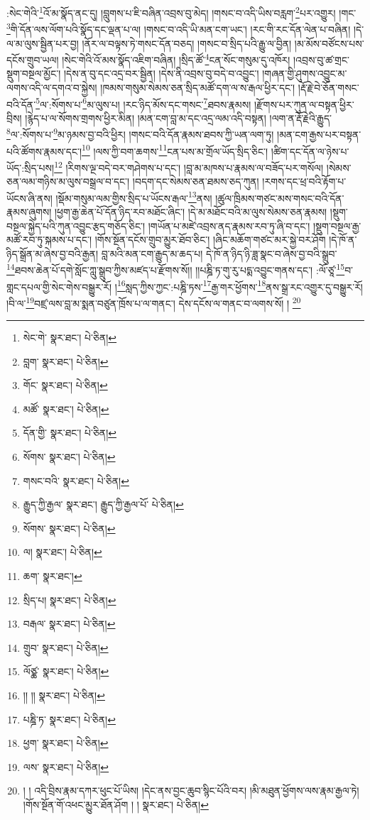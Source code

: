 :སེང་གེའི་\footnote{སེང་གེ་  སྣར་ཐང་།  པེ་ཅིན། }འོ་མ་སྣོད་ནང་དུ། །བླུགས་པ་ཇི་བཞིན་འབྲས་བུ་མེད། །གསང་བ་འདི་ཡིས་བརླག་\footnote{བླག་  སྣར་ཐང་།  པེ་ཅིན། }པར་འགྱུར། །གང་\footnote{གོང་  སྣར་ཐང་།  པེ་ཅིན། }གི་དོན་ལས་ལོག་པའི་སྣོད་དང་ལྡན་པ་ལ། །གསང་བ་འདི་ཡི་མན་ངག་ཡང་། །རང་གི་རང་དོན་ལེན་པ་བཞིན། །དེ་ལ་མ་ལུས་སྦྱིན་པར་བྱ། །ནོར་ལ་བལྟས་ཏེ་གསང་དོན་བཅད། །གསང་བ་སྲིད་པའི་རྒྱུ་ལ་བྱིན། །མ་མོས་བཙོངས་པས་དངོས་གྲུབ་ཡལ། །སེང་གེའི་འོ་མས་སྣོད་འཇིག་བཞིན། །སྲིད་ཚོ་\footnote{མཚོ་  སྣར་ཐང་།  པེ་ཅིན། }ངན་སོང་གསུམ་དུ་འཁོར། །འབྲས་བུ་ཚ་གྲང་སྡུག་བསྔལ་མྱོང་། །དེས་ན་བུ་དང་འདྲ་བར་སྦྱིན། །དེས་ནི་འབྲས་བུ་བདེ་བ་འབྱུང་། །གཞན་གྱི་ཤུགས་འབྱུང་མ་ལགས་འདི་ལ་དགའ་བ་སྐྱེས། །ཁམས་གསུམ་སེམས་ཅན་སྲིད་མཚོ་དག་ལ་ས་རྒལ་ཕྱིར་དང་། །རྡོ་རྗེ་བེ་ཅོན་གསང་བའི་དོན་\footnote{དོན་གྱི་  སྣར་ཐང་།  པེ་ཅིན། }ལ་:སོགས་པ་\footnote{སོགས་  སྣར་ཐང་།  པེ་ཅིན། }མ་ལུས་པ། །རང་ཉིད་མོས་དང་གསང་\footnote{གསང་བའི་  སྣར་ཐང་།  པེ་ཅིན། }ཐབས་རྣམས། །རྫོགས་པར་ཀུན་ལ་བསྟན་ཕྱིར་བྲིས། །རྙེད་པ་ལ་སོགས་གྲགས་ཕྱིར་མིན། །མན་ངག་བླ་མ་དང་འདྲ་ལམ་འདི་བསྟན། །ལག་ན་རྡོ་རྗེའི་རྒྱུད་\footnote{རྒྱུད་ཀྱི་རྒྱལ་  སྣར་ཐང་། རྒྱུད་ཀྱི་རྒྱལ་པོ་  པེ་ཅིན། }ལ་:སོགས་པ་\footnote{སོགས་  སྣར་ཐང་།  པེ་ཅིན། }མ་ཉམས་བྱ་བའི་ཕྱིར། །གསང་བའི་དོན་རྣམས་ཐབས་ཀྱི་ཡན་ལག་ཏུ། །མན་ངག་རྒྱས་པར་བསྟན་པའི་ཚོགས་རྣམས་དང་།\footnote{ལ།  སྣར་ཐང་།  པེ་ཅིན། } །ལས་ཀྱི་བག་ཆགས་\footnote{ཆག་  སྣར་ཐང་། }ངན་པས་མ་གྲོལ་ཡོད་སྲིད་ཅིང་། །ཚིག་དང་དོན་ལ་ཉེས་པ་ཡོད་:སྲིད་པས།\footnote{སྲིད་པ།  སྣར་ཐང་།  པེ་ཅིན། } །རིགས་ལྔ་བདེ་བར་གཤེགས་པ་དང་། །བླ་མ་མཁས་པ་རྣམས་ལ་བཟོད་པར་གསོལ། །སེམས་ཅན་ལམ་གཉིས་མ་ལུས་བསྒྲལ་བ་དང་། །བདག་དང་སེམས་ཅན་ཐམས་ཅད་ཀུན། །རགས་དང་ཕྲ་བའི་རྟོག་པ་ཡོངས་ཞི་ནས། །སྡོམ་གསུམ་ལམ་གྱིས་སྲིད་པ་ཡོངས་རྒལ་\footnote{བརྒལ་  སྣར་ཐང་།  པེ་ཅིན། }ནས། །ཚུལ་ཁྲིམས་གཙང་མས་གསང་བའི་དོན་རྣམས་ཞུགས། །ཕྱག་རྒྱ་ཆེན་པོ་དོན་ཉིད་རབ་མཐོང་ཞིང་། །དེ་མ་མཐོང་བའི་མ་ལུས་སེམས་ཅན་རྣམས། །སྡུག་བསྔལ་སྐྱེད་པའི་ཀུན་འབྱུང་རྩད་གཅོད་ཅིང་། །གཡོན་པ་མཛེ་འབྲས་ནད་རྣམས་རབ་ཏུ་ཞི་བ་དང་། །སྡུག་བསྔལ་རྒྱ་མཚོ་རབ་ཏུ་སྐམས་པ་དང་། །གོས་སྔོན་དངོས་གྲུབ་མྱུར་ཐོབ་ཅིང་། །ཞིང་མཆོག་གཙང་མར་སྐྱེ་བར་ཤོག །དེ་ཁོ་ན་ཉིད་སྒྲོན་མ་ཞེས་བྱ་བའི་རྒྱན། བླ་མའི་མན་ངག་རྒྱུད་མ་ཆད་པ། དེ་ཁོ་ན་ཉིད་ཉི་ཟླ་སྣང་བ་ཞེས་བྱ་བའི་སྒྲུབ་\footnote{གྲུབ་  སྣར་ཐང་།  པེ་ཅིན། }ཐབས་ཆེན་པོ་དགེ་སློང་ཀླུ་སྒྲུབ་ཀྱིས་མཛད་པ་རྫོགས་སོ།། །།པཎྜི་ཏ་གུ་རུ་པདྨ་འབྱུང་གནས་དང་། :ལོ་ཙཱ་\footnote{ལོཙྪ་  སྣར་ཐང་།  པེ་ཅིན། }བ་གླང་དཔལ་གྱི་སེང་གེས་བསྒྱུར་རོ། །\footnote{།། །།  སྣར་ཐང་།  པེ་ཅིན། }སླད་ཀྱིས་ཀྱང་:པཎྜི་ཏས་\footnote{པཎྜི་ཏ་  སྣར་ཐང་།  པེ་ཅིན། }རྒྱ་གར་ཕྱོགས་\footnote{ཕྱག་  སྣར་ཐང་།  པེ་ཅིན། }ནས་སྒྲ་རང་འགྱུར་དུ་བསྒྱུར་རོ། །བི་ལ་\footnote{ལས་  སྣར་ཐང་།  པེ་ཅིན། }བཛྲ་ལས་བླ་མ་སྨན་བཙུན་ཁྲོས་པ་ལ་གནང་། དེས་དངོས་ལ་གནང་བ་ལགས་སོ། ། \footnote{། ། འདི་བྲིས་རྣམ་དཀར་ཕུང་པོ་ཡིས། །དེང་ནས་བྱང་ཆུབ་སྙིང་པོའི་བར། །མི་མཐུན་ཕྱོགས་ལས་རྣམ་རྒྱལ་ཏེ། །གོས་སྔོན་གོ་འཕང་མྱུར་ཐོན་ཤོག ། །  སྣར་ཐང་།  པེ་ཅིན། }